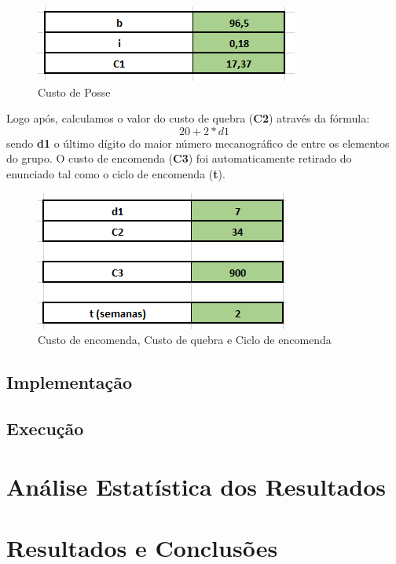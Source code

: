 \documentclass[a4paper]{article}
\begin{document}
\begin{figure}[H]
\centering
\includegraphics[scale=0.6]{Posse.png}
\caption{Custo de Posse}
\label{img:Posse}
\end{figure}

Logo após, calculamos o valor do custo de quebra (\textbf{C2}) através da fórmula: $$20+2*d1$$ sendo \textbf{d1} o último dígito do maior número mecanográfico de entre os elementos do grupo.
O custo de encomenda (\textbf{C3}) foi automaticamente retirado do enunciado tal como o ciclo de encomenda (\textbf{t}).

\begin{figure}[H]
\centering
\includegraphics[scale=0.6]{c3c2t.png}
\caption{Custo de encomenda, Custo de quebra e Ciclo de encomenda}
\label{img:C3C2t}
\end{figure}

\subsection{Implementação}

\subsection{Execução}

\section{Análise Estatística dos Resultados}

\section{Resultados e Conclusões}
\label{sec:conclusao}
\end{document}

